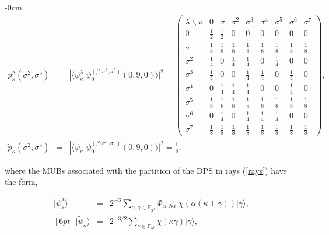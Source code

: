 \documentclass[quantumrep,article,submit,pdftex,moreauthors]{Definitions/mdpi}
\DeclareMathOperator{\tr}{tr}
\begin{document}
\begin{adjustwidth}{-\extralength}{0cm}
\begin{eqnarray}
  p_{\kappa }^{\lambda }\left(\sigma^{2}, \sigma^{5}\right)
  &=& |\langle\psi_{\kappa }^{\lambda }
  |\psi_{0}^{(\beta ;\sigma ^{2},\sigma^{5})}(0,9,0)\rangle|^{2}
  = \left(\begin{array}{ccccccccc}
    \lambda \backslash \kappa  & 0 & \sigma  & \sigma ^{2} & \sigma ^{3} &
    \sigma ^{4} & \sigma ^{5} & \sigma ^{6} & \sigma ^{7} \\ 
    0 & \frac{1}{2} & \frac{1}{2} & 0 & 0 & 0 & 0 & 0 & 0 \\ [6pt]
    \sigma & \frac{1}{8} & \frac{1}{8} & \frac{1}{8} & \frac{1}{8} &
    \frac{1}{8} & \frac{1}{8} & \frac{1}{8} & \frac{1}{8} \\  [6pt]
    \sigma^{2} & \frac{1}{4} & 0 & \frac{1}{4} & \frac{1}{4} & 0 &
    \frac{1}{4} & 0 & 0 \\  [6pt]
    \sigma^{3} & \frac{1}{4} & 0 & 0 & \frac{1}{4} & \frac{1}{4} & 0 &
    \frac{1}{4} & 0 \\  [6pt]
    \sigma^{4} & 0 & \frac{1}{4} & \frac{1}{4} & \frac{1}{4} & 0 & 0 &
    \frac{1}{4} & 0 \\  [6pt]
    \sigma^{5} & \frac{1}{8} & \frac{1}{8} & \frac{1}{8} & \frac{1}{8} &
    \frac{1}{8} & \frac{1}{8} & \frac{1}{8} & \frac{1}{8} \\  [6pt]
    \sigma^{6} & 0 & \frac{1}{4} & 0 & \frac{1}{4} & \frac{1}{4} &
    \frac{1}{4} & 0 & 0 \\  [6pt]
    \sigma^{7} & \frac{1}{8} & \frac{1}{8} & \frac{1}{8} & \frac{1}{8} &
    \frac{1}{8} & \frac{1}{8} & \frac{1}{8} & \frac{1}{8}
  \end{array}\right), \\
  \tilde{p}_{\kappa }(\sigma^{2},\sigma^{5})
  &=& |\langle \tilde\psi_\kappa | \psi_0^{(\beta;\sigma^2,\sigma^5)}(0,9,0)\rangle|^2
  = \frac{1}{8},%
\end{eqnarray}
\end{adjustwidth}

where the MUBs associated with the partition of the DPS in rays (\ref{rays})
have the form,

\begin{eqnarray}
  |\psi_{\kappa }^{\lambda }\rangle
  &=& 2^{-3} \sum_{\alpha,\gamma \in \mathbb{F}_{2^{3}}}
  \Phi_{\alpha,\lambda \alpha} \;
  \chi\left( \alpha(\kappa+\gamma) \right) 
  |\gamma \rangle, \\ [6pt]
  |\tilde{\psi}_{\kappa }\rangle
  &=& 2^{-3 / 2} \sum_{\gamma \in \mathbb{F}_{2^{3}}}
  \chi\left( \kappa\gamma \right) 
  |\gamma \rangle,
\end{eqnarray}
\end{document}
